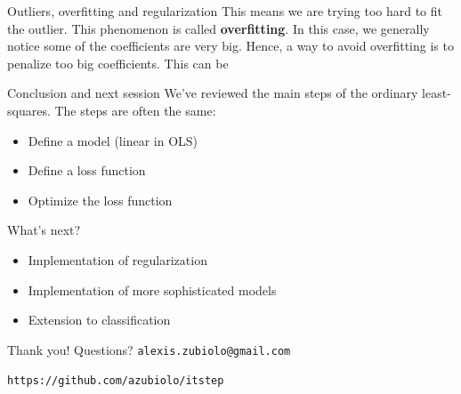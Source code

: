 \documentclass{beamer}
\newcommand{\1}[1]{\mathbbm{1}\left[#1\right]}
\begin{document}
\begin{frame}{Outliers, overfitting and regularization}
This means we are trying too hard to fit the outlier. 
\pause
\vfill
This phenomenon is called \textbf{overfitting}. In this case, we generally notice some of the coefficients are very big. Hence, a way to avoid overfitting is to penalize too big coefficients. This can be 

\end{frame}

\begin{frame}{Conclusion and next session}
We've reviewed the main steps of the ordinary least-squares. The steps are often the same:
\begin{itemize}
	\item Define a model (linear in OLS)
	\item Define a loss function
	\item Optimize the loss function
\end{itemize}
\pause
\vfill
What's next?
\begin{itemize}
	\item Implementation of regularization
	\item Implementation of more sophisticated models
	\item Extension to classification
\end{itemize}
\end{frame}

\begin{frame}
\vfill
\centering
\begin{huge}
\huge{Thank you! Questions?}
\vfill
\texttt{alexis.zubiolo@gmail.com}
\end{huge}
\vfill
\begin{Large}
\texttt{https://github.com/azubiolo/itstep}
\end{Large}
\vfill
\end{frame}
\end{document}
